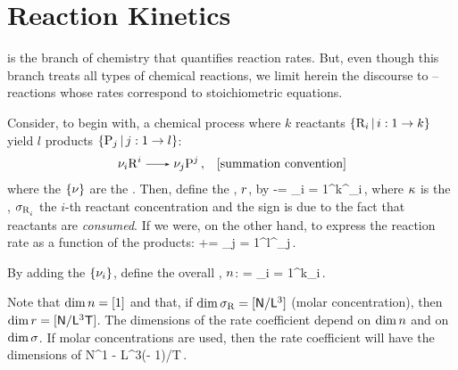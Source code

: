 \section{Reaction Kinetics}
 is the branch of chemistry that quantifies reaction rates. But, even though this branch treats all types of chemical reactions, we limit herein the discourse to  -- reactions whose rates correspond to stoichiometric equations.

Consider, to begin with, a chemical process where $k$ reactants $\setbuild{\ce R_i}{i:1\to k}$ yield $l$ products $\setbuild{\ce P_j}{j:1\to l}$:
\begin{align*}
&\kstnum_i\ce R^i \ce{->} \kstnum_j\ce P^j\,, & \text{[summation convention]}
\end{align*}
where the $\left\lbrace{\nu}\right\rbrace$ are the . Then, define the , $r$, by
\beq
-\rrate = \krcoeff\prod_{i = 1}^{k}^{\kstnum_i}\,,
\eeq
where $\kappa$ is the , $\conc{R,$i$}$ the $i$-th reactant concentration and the sign is due to the fact that reactants are \emph{consumed}. If we were, on the other hand, to express the reaction rate as a function of the products:
\beq
+\rrate = \krcoeff\prod_{j = 1}^{l}^{\kstnum_j}\,.
\eeq

By adding the $\left\lbrace{\nu_i}\right\rbrace$, define the overall , $n$:
\beq
\rorder = \sum_{i = 1}^{k}\kstnum_i\,.
\eeq

Note that $\dim n = [1]$ and that, if $\dim\conc R = [\phdim N/\phdim L^3]$ (molar concentration), then $\dim r = [\mathsf{N}/\mathsf{L}^3\mathsf{T}]$. The dimensions of the rate coefficient depend on $\dim n$ and on $\dim\conc{}$. If molar concentrations are used, then the rate coefficient will have the dimensions of 
\beq
\phdim N^{1 - \rorder}\phdim L^{3(\rorder - 1)}/\phdim T\,.
\eeq


